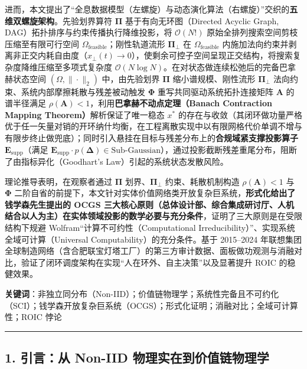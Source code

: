 \documentclass[
]{article}
\begin{document}
进而，本文提出了``全息数据模型（左螺旋）与动态演化算法（右螺旋）''交织的\textbf{五维双螺旋架构}。先验划界算符
\(\mathbf{\Pi}\) 基于有向无环图（Directed Acyclic Graph,
DAG）拓扑排序与约束传播执行降维投影，将 \(\mathcal{O}(N!)\)
原始全排列搜索空间剪枝压缩至有限可行空间
\(\Omega_{\mathrm{feasible}}\)；刚性轨道流形 \(\mathbf{\Pi}_\bot\) 在
\(\Omega_{\mathrm{feasible}}\)
内施加法向约束并剥离非正交内耗自由度（\(x_\bot(t) \to 0\)），使剩余可控子空间呈现正交结构，将搜索复杂度降维压缩至多项式复杂度
\(\mathcal{O}(N \log N)\)。在对状态做连续松弛后的完备巴拿赫状态空间
\((\Omega, \|\cdot\|_2)\) 中，由先验划界 \(\mathbf{\Pi}\)
缩小谱规模、刚性流形 \(\mathbf{\Pi}_\bot\)
法向约束、系统内部摩擦耗散与残差被动触发 \(\mathbf{\Phi}\)
重写共同驱动系统拓扑连接矩阵 \(\mathbf{A}\) 的谱半径满足
\(\rho(\mathbf{A}) < 1\)，利用\textbf{巴拿赫不动点定理（Banach
Contraction Mapping Theorem）}解析保证了唯一稳态 \(x^\ast\)
的存在与收敛（其闭环做功量严格优于任一矢量对销的开环纳什均衡，在工程离散实现中以有限网格代价单调不增与有限步终止做兜底）；同时引入悬挂在目标与残差分布上的\textbf{合规域紧支撑投影算子
\(\mathbf{E}_{\mathrm{supp}}\)}（满足
\(\mathbf{E}_{\mathrm{supp}} \cdot p(\mathbf{\Delta}) \in \text{Sub-Gaussian}\)），通过投影截断残差重尾分布，阻断了由指标异化（Goodhart's
Law）引起的系统状态发散风险。

理论推导表明，在观察者通过 \(\mathbf{\Pi}\) 划界、\(\mathbf{\Pi}_\bot\)
约束、耗散机制构造 \(\rho(\mathbf{A}) < 1\) 与 \(\mathbf{\Phi}\)
二阶自省的前提下，本文针对实体价值网络类开放复杂巨系统，\textbf{形式化给出了钱学森先生提出的
OCGS
三大核心原则（总体设计部、综合集成研讨厅、人机结合以人为主）在实体领域投影的数学必要与充分条件}，证明了三大原则是在受限结构下规避
Wolfram``计算不可约性（Computational
Irreducibility）''、实现系统全域可计算（Universal
Computability）的充分条件。基于 2015--2024
年联想集团全球制造网络（含合肥联宝灯塔工厂）的第三方审计数据、面板做功观测与消融对比，验证了闭环调度架构在实现``人在环外、自主决策''以及显著提升
ROIC 的稳健效果。

\textbf{关键词}：非独立同分布（Non-IID）；价值链物理学；系统性完备且不可约化（SCI）；钱学森开放复杂巨系统（OCGS）；形式化证明；消融对比；全域可计算性；ROIC
悖论

\begin{center}\rule{0.5\linewidth}{0.5pt}\end{center}

\subsection{1. 引言：从 Non-IID
物理实在到价值链物理学}\label{ux5f15ux8a00ux4ece-non-iid-ux7269ux7406ux5b9eux5728ux5230ux4ef7ux503cux94feux7269ux7406ux5b66}
\end{document}
